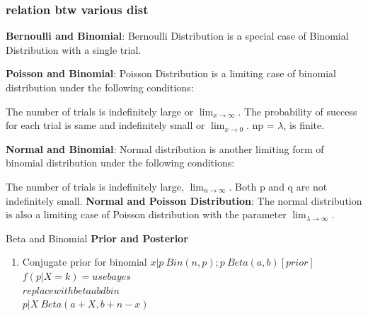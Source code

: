 \documentclass{beamer}
\begin{document}
\begin{frame}
\begin{figure}
\end{figure}
\end{frame}








\begin{frame}\frametitle{relation btw various dist}
\textbf{Bernoulli and Binomial}: Bernoulli Distribution is a special case of Binomial Distribution with a single trial.

\textbf{Poisson and Binomial}: Poisson Distribution is a limiting case of binomial distribution under the following conditions:

The number of trials is indefinitely large or $\displaystyle{\lim_{x \to \infty}}$.
The probability of success for each trial is same and indefinitely small or $\displaystyle{\lim_{x \to 0}}$.
np = $\lambda$, is finite.

\textbf{Normal and Binomial}: Normal distribution is another limiting form of binomial distribution under the following conditions:

The number of trials is indefinitely large, $\displaystyle{\lim_{n \to \infty}}$.
Both p and q are not indefinitely small.
\textbf{Normal and Poisson Distribution}:
The normal distribution is also a limiting case of Poisson distribution with the parameter $\displaystyle{\lim_{\lambda \to \infty}}$.



\end{frame}

\begin{frame}{Beta and Binomial}
\textbf{Prior and Posterior}
\begin{enumerate}
\item 	Conjugate prior for binomial
$ x|p ~ Bin(n,p); p~Beta(a,b) [prior]$\\
$ f(p|X=k) = use bayes$ \\
$ replace with beta abd bin $ \\
$ p|X ~ Beta(a+X, b+n-x) $

\end{enumerate}
\end{frame}
\end{document}
